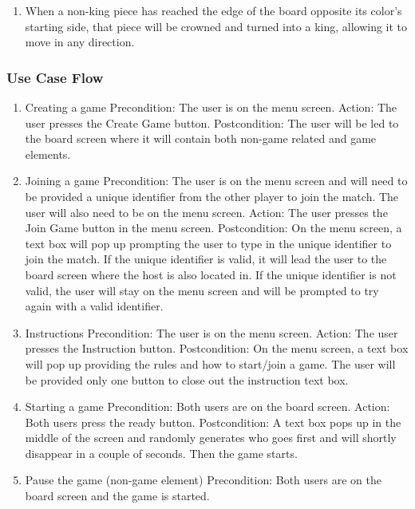 \documentclass[10pt]{article}
\begin{document}
\begin{enumerate}[label*=G\arabic*.]
\item When a non-king piece has reached the edge of the board opposite its color’s starting side, that piece will be crowned and turned into a king, allowing it to move in any direction.
\end{enumerate}

\subsubsection{Use Case Flow}
\begin{enumerate}
    \item Creating a game
        \subitem Precondition: The user is on the menu screen.
        \subitem Action: The user presses the Create Game button.
        \subitem Postcondition: The user will be led to the board screen where it will contain both non-game related and game elements.
    \item Joining a game
        \subitem Precondition: The user is on the menu screen and will need to be provided a unique identifier from the other player to join the match. The user will also need to be on the menu screen.
        \subitem Action: The user presses the Join Game button in the menu screen.
        \subitem Postcondition: On the menu screen, a text box will pop up prompting the user to type in the unique identifier to join the match.
            \subsubitem If the unique identifier is valid, it will lead the user to the board screen where the host is also located in.
            \subsubitem If the unique identifier is not valid, the user will stay on the menu screen and will be prompted to try again with a valid identifier.
    \item Instructions
        \subitem Precondition: The user is on the menu screen.
        \subitem Action: The user presses the Instruction button.
        \subitem Postcondition: On the menu screen, a text box will pop up providing the rules and how to start/join a game. The user will be provided only one button to close out the instruction text box.
    \item Starting a game
        \subitem Precondition: Both users are on the board screen.
        \subitem Action: Both users press the ready button.
        \subitem Postcondition: A text box pops up in the middle of the screen and randomly generates who goes first and will shortly disappear in a couple of seconds. Then the game starts.
    \item Pause the game (non-game element)
        \subitem Precondition: Both users are on the board screen and the game is started.

\end{enumerate}
\end{document}
